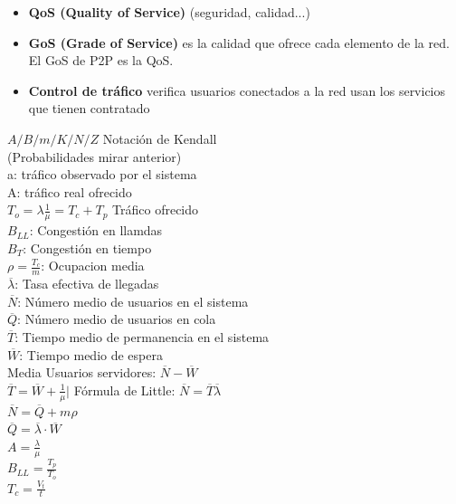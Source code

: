 \vfill\null
\columnbreak
{}
\begin{minipage}{.22\textwidth}
	\begin{itemize}[leftmargin=*]
		\item {\bf QoS (Quality of Service)} (seguridad, calidad...)
		\item {\bf GoS (Grade of Service)} es la calidad que ofrece cada elemento de la red. El GoS de P2P es la QoS.
		\item {\bf Control de tráfico} verifica usuarios conectados a la red usan los servicios que tienen contratado
	\end{itemize}
\end{minipage}

\begin{minipage}{.22\textwidth}
	$A/B/m/K/N/Z$ Notación de Kendall \\
	(Probabilidades mirar anterior) \\
	a: tráfico observado por el sistema \\
	A: tráfico real ofrecido \\
	$T_o = \lambda \frac{1}{\mu} = T_c + T_p$ Tráfico ofrecido\\
	$B_{LL}$: Congestión en llamdas\\
	$B_{T}$: Congestión en tiempo\\
	$\rho = \frac{T_c}{m}$: Ocupacion media\\
	$\overline{\lambda}$: Tasa efectiva de llegadas\\
	$\overline{N}$: Número medio de usuarios en el sistema\\
	$\overline{Q}$: Número medio de usuarios en cola\\
	$\overline{T}$: Tiempo medio de permanencia en el sistema\\
	$\overline{W}$: Tiempo medio de espera\\
	Media Usuarios servidores: $\overline{N}-\overline{W}$ \\
	$\overline{T} =\overline{W}+\frac{1}{\mu}|$ Fórmula de Little: $\overline{N} =\overline{T}\overline{\lambda}$\\
	$\overline{N} = \overline{Q} + m{\rho}$\\
	$\overline{Q} = \overline{\lambda} \cdot \overline{W} $\\
	$A=\frac{\lambda}{\mu}$ \\
	$B_{LL}=\frac{T_p}{T_o}$ \\
	$T_c=\frac{V_t}{t}$ \\
\end{minipage}

